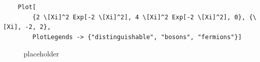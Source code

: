 \documentclass[11pt]{article}
\begin{document}

\pagestyle{fancy}
\fancyhf{}
\cfoot{\thepage}

\begin{lstlisting}
    Plot[
        {2 \[Xi]^2 Exp[-2 \[Xi]^2], 4 \[Xi]^2 Exp[-2 \[Xi]^2], 0}, {\[Xi], -2, 2},
        PlotLegends -> {"distinguishable", "bosons", "fermions"}]
\end{lstlisting}

\begin{figure}[h!] %
    \centering
    \caption{placeholder}
    \label{fig:fig1}
\end{figure}



\end{document}

